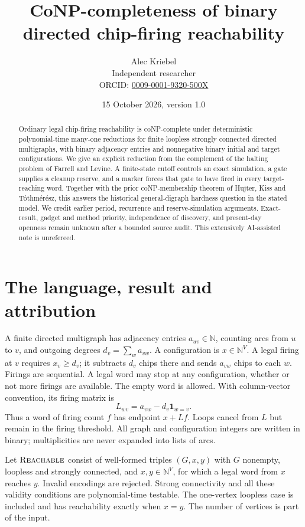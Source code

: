 \documentclass[11pt]{article}
\title{CoNP-completeness of binary directed chip-firing reachability}
\author{Alec Kriebel\\Independent researcher\\
\small ORCID: \href{https://orcid.org/0009-0001-9320-500X}{0009-0001-9320-500X}}
\date{15 October 2026, version 1.0}
\newcommand{\N}{\mathbb N}
\newcommand{\reach}{\textsc{Reachable}}
\begin{document}
\maketitle
\begin{abstract}
Ordinary legal chip-firing reachability is coNP-complete under deterministic
polynomial-time many-one reductions for finite loopless strongly connected
directed multigraphs, with binary adjacency entries and nonnegative binary
initial and target configurations. We give an explicit reduction from the
complement of the halting problem of Farrell and Levine. A finite-state
cutoff controls an exact simulation, a gate supplies a cleanup reserve, and
a marker forces that gate to have fired in every target-reaching word.
Together with the prior coNP-membership theorem of Hujter, Kiss and
T\'othm\'er\'esz, this answers the historical general-digraph hardness
question in the stated model. We credit earlier period, recurrence and
reserve-simulation arguments. Exact-result, gadget and method priority,
independence of discovery, and present-day openness remain unknown after a
bounded source audit. This extensively AI-assisted note is unrefereed.
\end{abstract}

\section{The language, result and attribution}
A finite directed multigraph has adjacency entries $a_{uv}\in\N$, counting
arcs from $u$ to $v$, and outgoing degrees $d_v=\sum_w a_{vw}$. A
configuration is $x\in\N^V$. A legal firing at $v$ requires $x_v\geq d_v$;
it subtracts $d_v$ chips there and sends $a_{vw}$ chips to each $w$.
Firings are sequential. A legal word may stop at any configuration,
whether or not more firings are available. The empty word is allowed.
With column-vector convention, its firing matrix is
\[
 L_{wv}=a_{vw}-d_v\mathbf1_{w=v}.
\]
Thus a word of firing count $f$ has endpoint $x+Lf$. Loops cancel from
$L$ but remain in the firing threshold. All graph and configuration
integers are written in binary; multiplicities are never expanded into
lists of arcs.

Let $\reach$ consist of well-formed triples $(G,x,y)$ with $G$ nonempty,
loopless and strongly connected, and $x,y\in\N^V$, for which a legal word
from $x$ reaches $y$. Invalid encodings are rejected. Strong connectivity
and all these validity conditions are polynomial-time testable. The
one-vertex loopless case is included and has reachability exactly when
$x=y$. The number of vertices is part of the input.
\end{document}
